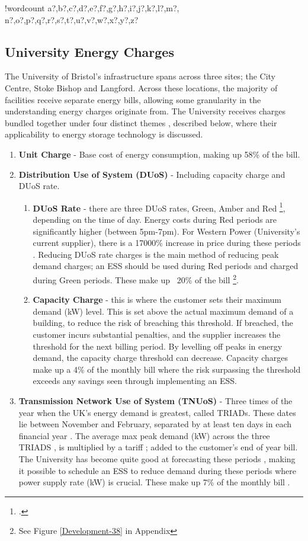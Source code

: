 \documentclass[fontsize=9.5pt]{extarticle}
\numberwithin{figure}{section} %
\newcounter{words}
\newenvironment{counted}{%
  \setcounter{words}{0}
  \SearchList!{wordcount}{\stepcounter{words}}
    {a?,b?,c?,d?,e?,f?,g?,h?,i?,j?,k?,l?,m?,
    n?,o?,p?,q?,r?,s?,t?,u?,v?,w?,x?,y?,z?}
  \UndoBoundary{'}
  \SearchOrder{p;}}{%
  \StopSearching}
\begin{document}
\begin{counted}
\subsection{University Energy Charges}\label{university-energy-charges}

The University of Bristol's infrastructure spans across three sites; the
City Centre, Stoke Bishop and Langford. Across these locations, the
majority of facilities receive separate energy bills, allowing some
granularity in the understanding energy charges originate
from\cite{Jbrentmeet}. The University receives charges bundled together
under four distinct themes \cite{Jbrentmeet}, described below, where
their applicability to energy storage technology is discussed.

\begin{enumerate}
\item \textbf{Unit Charge} - Base cost of energy consumption, making up 58\% of the bill.
\item \textbf{Distribution Use of System (DUoS)} - Including capacity charge and DUoS rate.
\begin{enumerate}
\item \textbf{DUoS Rate} - there are three DUoS rates, Green, Amber and Red \footcite[\label{unitbill}See page 27 of][25.405 p/kWh in Red, against 0.147p/kWh in Green]{SWEB201492:online}, depending on the time of day. Energy costs during Red periods are significantly higher (between 5pm-7pm). For Western Power (University's current supplier), there is a 17000\% increase in price during these periods . Reducing DUoS rate charges is the main method of reducing peak demand charges; an ESS should be used during Red periods and charged during Green periods. These make up ~20\% of the bill \footnote{\label{bill}See Figure \ref{Development-38} in Appendix}.
\item \textbf{Capacity Charge} - this is where the customer sets their maximum demand (kW) level\cite{Deconstr52:online}. This is set above the actual maximum demand of a building, to reduce the risk of breaching this threshold. If breached, the customer incurs substantial penalties, and the supplier increases the threshold for the next billing period. By levelling off peaks in energy demand, the capacity charge threshold can decrease. Capacity charges make up a 4\% of the monthly bill  where the risk surpassing the threshold exceeds any savings seen through implementing an ESS.
\end{enumerate}
\item \textbf{Transmission Network Use of System (TNUoS)} - Three times of the year when the UK's energy demand is greatest, called TRIADs. These dates lie between November and February, separated by at least ten days in each financial year \cite{TriadsWh7:online}. The average max peak demand (kW) across the three TRIADS \cite{TNUoSTra99:online}, is multiplied by a tariff \cite{TNUoScha93:online}; added to the customer's end of year bill. The University has become quite good at forecasting these periods \cite{Jbrentmeet}, making it possible to schedule an ESS to reduce demand during these periods where power supply rate (kW) is crucial. These make up 7\% of the monthly bill .

\end{enumerate}
\end{counted}
\end{document}
